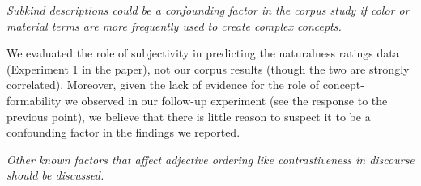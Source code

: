 \documentclass[12pt]{article}
\begin{document}




\item  \emph{Subkind descriptions could be a confounding factor in the corpus study if color or material terms are more frequently used to create complex concepts.}

We evaluated the role of subjectivity in predicting the naturalness ratings data (Experiment 1 in the paper), not our corpus results (though the two are strongly correlated). Moreover, given the lack of evidence for the role of concept-formability we observed in our follow-up experiment (see the response to the previous point), we believe that there is little reason to suspect it to be a confounding factor in the findings we reported. 



\item \emph{Other known factors that affect adjective ordering like contrastiveness in discourse should be discussed.}
\end{document}

